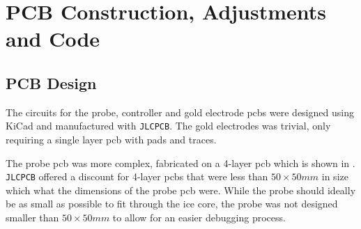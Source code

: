 
\chapter{PCB Construction, Adjustments and Code}

\section{PCB Design}

The circuits for the probe, controller and gold electrode \glspl{pcb} were designed using KiCad and manufactured with \texttt{JLCPCB}.
The gold electrodes was trivial, only requiring a single layer \gls{pcb} with pads and traces.

The probe \gls{pcb} was more complex, fabricated on a 4-layer \gls{pcb} which is shown in .
\texttt{JLCPCB} offered a discount for 4-layer \glspl{pcb} that were less than $50\times 50mm$ in size which what the dimensions of the probe \gls{pcb} were.
While the probe should ideally be as small as possible to fit through the ice core, the probe was not designed smaller than $50\times 50mm$ to allow for an easier debugging process.

